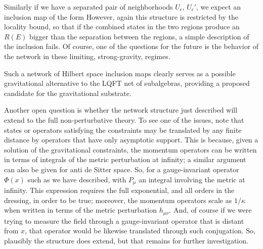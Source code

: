 Similarly if we have a separated pair of neighborhoods $U_\epsilon$, $U_\epsilon'$, we expect an inclusion map of the form
%
\eqn{}
%
However, again this structure is restricted by the locality bound, so that if the combined states in the two regions produce an $R(E)$ bigger than the separation between the regions, a simple description of the inclusion fails.  Of course, one of the questions for the future is the behavior of the network in these limiting, strong-gravity, regimes.

Such a network of Hilbert space inclusion maps clearly serves as a possible gravitational alternative to the LQFT net of subalgebras, providing a proposed candidate for the gravitational substrate.

Another open question is whether the network structure just described will extend to the full non-perturbative theory.  To see one of the issues, note that states or operators satisfying the constraints may be translated by any finite distance by operators that have only asymptotic support.  This is because, given a solution of the gravitational constraints, the momentum operators can be written in terms of integrals of the metric perturbation at infinity; a similar argument can also be given for anti de Sitter space.  So, for a gauge-invariant operator $\Phi(x)$ such as we have described, 
%
\eqn{}
%
with $P_\mu$ an integral involving the metric at infinity.
This expression requires the full exponential, and all orders in the dressing, in order to be true\DoGithree; moreover, the momentum operators scale as $1/\kappa$ when written in terms of the metric perturbation $h_{\mu\nu}$.  And, of course if we were trying to measure the field through a gauge-invariant operator that is distant from $x$, that operator would be likewise translated through such conjugation.  So, plausibly the structure does extend, but that remains for further investigation.



